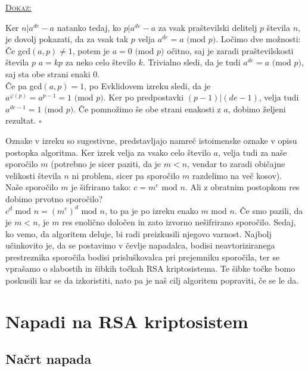 \documentclass[a4paper, 12pt]{article} %
\newenvironment{matematika}[1]{
\textcolor{bostonuniversityred}{\underline{\textsc{#1:}}}
}{
}
\begin{document}
\begin{matematika}{Dokaz}
Ker $n | a^{de} - a$ natanko tedaj, ko $p | a^{de} - a$ za vsak praštevilski delitelj $p$ števila $n$, je dovolj pokazati, da za vsak tak $p$ velja $a^{de} = a \text{ (mod } p)$. Ločimo dve možnosti: \\
Če gcd$(a, p) \neq 1$, potem je $a = 0 \text{ (mod } p)$ očitno, saj je zaradi praštevilskosti števila $p$ $a = kp$ za neko celo število $k$. Trivialno sledi, da je tudi $a^{de} = a \text{ (mod } p)$, saj sta obe strani enaki $0$. \\
Če pa gcd$(a, p) = 1$, po Evklidovem izreku sledi, da je $a^{\varphi (p)} = a^{p-1} = 1 \text{ (mod } p)$. Ker po predpostavki $(p-1)|(de-1)$, velja tudi $a^{de-1} = 1 \text{ (mod } p)$. Če pomnožimo še obe strani enakosti z $a$, dobimo željeni rezultat. \hspace*{\fill} $\square$ \\
\end{matematika}

Oznake v izreku so sugestivne, predstavljajo namreč istoimenske oznake v opisu postopka algoritma. Ker izrek velja za vsako celo število $a$, velja tudi za naše sporočilo $m$ (potrebno je sicer paziti, da je $m < n$, vendar to zaradi običajne velikosti števila $n$ ni problem, sicer pa sporočilo $m$ razdelimo na več kosov). \\
Naše sporočilo $m$ je šifrirano tako: $c = m^e \text{ mod } n$. Ali z obratnim postopkom res dobimo prvotno sporočilo? \\
$c^d \text{ mod } n = (m^{e})^{d} \text{ mod } n$, to pa je po izreku enako $m \text{ mod } n$. Če smo pazili, da je $m < n$, je $m$ res enolično določen in zato izvorno nešifrirano sporočilo.
\newline
\newline
Sedaj, ko vemo, da algoritem deluje, bi radi preizkusili njegovo varnost. Najbolj učinkovito je, da se postavimo v čevlje napadalca, bodisi neavtoriziranega prestreznika sporočila bodisi prisluškovalca pri prejemniku sporočila, ter se vprašamo o slabostih in šibkih točkah RSA kriptosistema. Te šibke točke bomo poskusili kar se da izkoristiti, nato pa je naš cilj algoritem popraviti, če se le da.

\newpage

\section{Napadi na RSA kriptosistem}

\subsection{Načrt napada}
\end{document}
